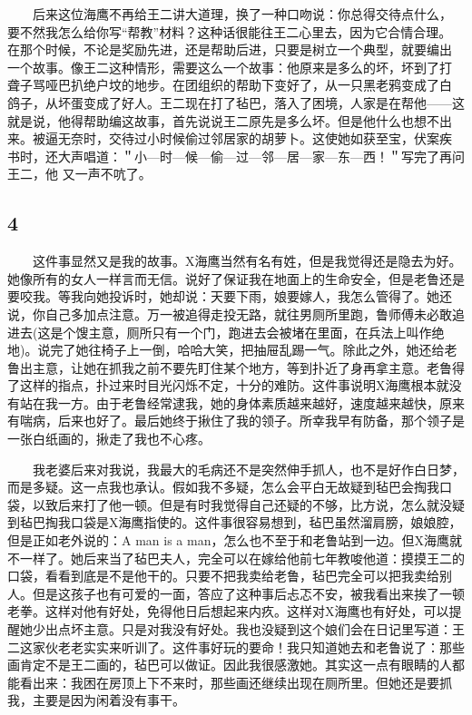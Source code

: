 　　后来这位海鹰不再给王二讲大道理，换了一种口吻说：你总得交待点什么，
要不然我怎么给你写“帮教”材料？这种话很能往王二心里去，因为它合情合理。
在那个时候，不论是奖励先进，还是帮助后进，只要是树立一个典型，就要编出
一个故事。像王二这种情形，需要这么一个故事：他原来是多么的坏，坏到了打
聋子骂哑巴扒绝户坟的地步。在团组织的帮助下变好了，从一只黑老鸦变成了白
鸽子，从坏蛋变成了好人。王二现在打了毡巴，落入了困境，人家是在帮他——这
就是说，他得帮助编这故事，首先说说王二原先是多么坏。但是他什么也想不出
来。被逼无奈时，交待过小时候偷过邻居家的胡萝卜。这使她如获至宝，伏案疾
书时，还大声唱道：＂小—时—候—偷—过—邻—居—家—东—西！＂写完了再问王二，他
又一声不吭了。

\subsection{4}

　　这件事显然又是我的故事。X海鹰当然有名有姓，但是我觉得还是隐去为好。她像所有的女人一样言而无信。说好了保证我在地面上的生命安全，但是老鲁还是要咬我。等我向她投诉时，她却说：天要下雨，娘要嫁人，我怎么管得了。她还说，你自己多加点注意。万一被追得走投无路，就往男厕所里跑，鲁师傅未必敢追进去(这是个馊主意，厕所只有一个门，跑进去会被堵在里面，在兵法上叫作绝地)。说完了她往椅子上一倒，哈哈大笑，把抽屉乱踢一气。除此之外，她还给老鲁出主意，让她在抓我之前不要先盯住某个地方，等到扑近了身再拿主意。老鲁得了这样的指点，扑过来时目光闪烁不定，十分的难防。这件事说明X海鹰根本就没有站在我一方。由于老鲁经常逮我，她的身体素质越来越好，速度越来越快，原来有喘病，后来也好了。最后她终于揪住了我的领子。所幸我早有防备，那个领子是一张白纸画的，揪走了我也不心疼。

　　我老婆后来对我说，我最大的毛病还不是突然伸手抓人，也不是好作白日梦，而是多疑。这一点我也承认。假如我不多疑，怎么会平白无故疑到毡巴会掏我口袋，以致后来打了他一顿。但是有时我觉得自己还疑的不够，比方说，怎么就没疑到毡巴掏我口袋是X海鹰指使的。这件事很容易想到，毡巴虽然溜肩膀，娘娘腔，但是正如老外说的：A man is a man，怎么也不至于和老鲁站到一边。但X海鹰就不一样了。她后来当了毡巴夫人，完全可以在嫁给他前七年教唆他道：摸摸王二的口袋，看看到底是不是他干的。只要不把我卖给老鲁，毡巴完全可以把我卖给别人。但是这孩子也有可爱的一面，答应了这种事后忐忑不安，被我看出来挨了一顿老拳。这样对他有好处，免得他日后想起来内疚。这样对X海鹰也有好处，可以提醒她少出点坏主意。只是对我没有好处。我也没疑到这个娘们会在日记里写道：王二这家伙老老实实来听训了。这件事好玩的要命！我只知道她去和老鲁说了：那些画肯定不是王二画的，毡巴可以做证。因此我很感激她。其实这一点有眼睛的人都能看出来：我困在房顶上下不来时，那些画还继续出现在厕所里。但她还是要抓我，主要是因为闲着没有事干。

